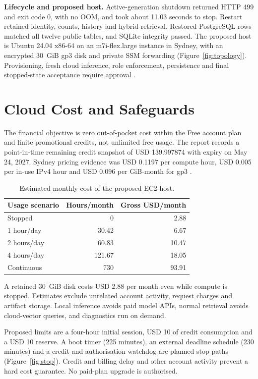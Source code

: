 \textbf{Lifecycle and proposed host.} Active-generation shutdown returned HTTP 499 and exit code 0, with no OOM, and took about 11.03 seconds to stop. Restart retained identity, counts, history and hybrid retrieval. Restored PostgreSQL rows matched all twelve public tables, and SQLite integrity passed. The proposed host is Ubuntu 24.04 x86-64 on an m7i-flex.large instance in Sydney, with an encrypted 30~GiB gp3 disk and private SSM forwarding (Figure~\ref{fig:topology}). Provisioning, fresh cloud inference, role enforcement, persistence and final stopped-state acceptance require approval \cite{AWSSM,AWSEC2}.

\section{Cloud Cost and Safeguards}

The financial objective is zero out-of-pocket cost within the Free account plan and finite promotional credits, not unlimited free usage. The report records a point-in-time remaining credit snapshot of USD 139.997874 with expiry on May 24, 2027. Sydney pricing evidence was USD 0.1197 per compute hour, USD 0.005 per in-use IPv4 hour and USD 0.096 per GiB-month for gp3 \cite{AWSFT,AWSEC2P,AWSEBSP,AWSVPCP}.

\begin{table}[htbp]
\centering
\begin{tabular}{@{}lrr@{}}
\toprule
\textbf{Usage scenario} & \textbf{Hours/month} & \textbf{Gross USD/month}\\
\midrule
Stopped & 0 & 2.88\\
1 hour/day & 30.42 & 6.67\\
2 hours/day & 60.83 & 10.47\\
4 hours/day & 121.67 & 18.05\\
Continuous & 730 & 93.91\\
\bottomrule
\end{tabular}
\caption{Estimated monthly cost of the proposed EC2 host.}
\label{tab:cost}
\end{table}

A retained 30~GiB disk costs USD 2.88 per month even while compute is stopped. Estimates exclude unrelated account activity, request charges and artifact storage. Local inference avoids paid model APIs, normal retrieval avoids cloud-vector queries, and diagnostics run on demand.

Proposed limits are a four-hour initial session, USD 10 of credit consumption and a USD 10 reserve. A boot timer (225 minutes), an external deadline schedule (230 minutes) and a credit and authorisation watchdog are planned stop paths (Figure~\ref{fig:stop}). Credit and billing delay and other account activity prevent a hard cost guarantee. No paid-plan upgrade is authorised.

